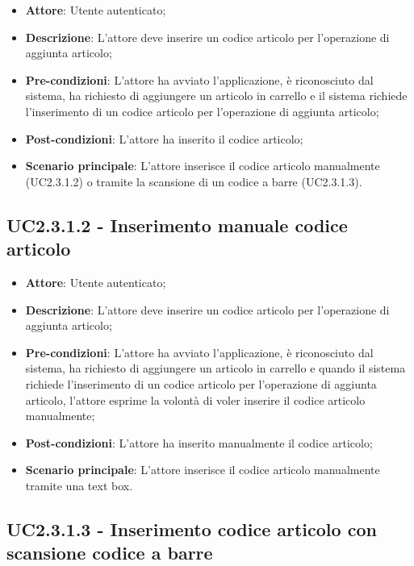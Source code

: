 \begin{itemize}
	\item \textbf{Attore}: Utente autenticato;
	\item \textbf{Descrizione}: L'attore deve inserire un codice articolo per l'operazione di aggiunta articolo;
	\item \textbf{Pre-condizioni}: L'attore ha avviato l'applicazione, è riconosciuto dal sistema, ha richiesto di aggiungere un articolo in carrello e il sistema richiede l'inserimento di un codice articolo per l'operazione di aggiunta articolo;
	\item \textbf{Post-condizioni}: L'attore ha inserito il codice articolo;
	\item \textbf{Scenario principale}: L'attore inserisce il codice articolo manualmente (UC2.3.1.2) o tramite la scansione di un codice a barre (UC2.3.1.3).
\end{itemize}

\subsection{UC2.3.1.2 - Inserimento manuale codice articolo}

\begin{itemize}
	\item \textbf{Attore}: Utente autenticato;
	\item \textbf{Descrizione}: L'attore deve inserire un codice articolo per l'operazione di aggiunta articolo;
	\item \textbf{Pre-condizioni}: L'attore ha avviato l'applicazione, è riconosciuto dal sistema, ha richiesto di aggiungere un articolo in carrello e quando il sistema richiede l'inserimento di un codice articolo per l'operazione di aggiunta articolo, l'attore esprime la volontà di voler inserire il codice articolo manualmente;
	\item \textbf{Post-condizioni}: L'attore ha inserito manualmente il codice articolo;
	\item \textbf{Scenario principale}: L'attore inserisce il codice articolo manualmente tramite una text box.
\end{itemize}

\subsection{UC2.3.1.3 - Inserimento codice articolo con scansione codice a barre}

